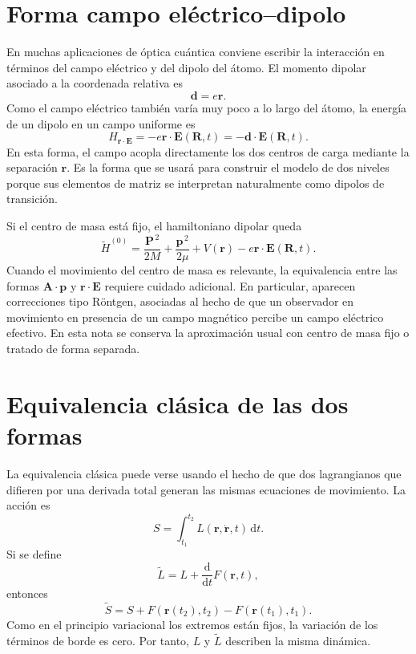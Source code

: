 \documentclass[11pt]{article}
\newcommand{\dd}{\mathrm{d}}
\newcommand{\vb}[1]{\mathbf{#1}}
\begin{document}
\section{Forma campo el\'ectrico--dipolo}

En muchas aplicaciones de \'optica cu\'antica conviene escribir la interacci\'on
en t\'erminos del campo el\'ectrico y del dipolo del \'atomo. El momento dipolar
asociado a la coordenada relativa es
\begin{equation}
  \vb d=e\vb r.
\end{equation}
Como el campo el\'ectrico tambi\'en var\'ia muy poco a lo largo del \'atomo,
la energ\'ia de un dipolo en un campo uniforme es
\begin{equation}
  \boxed{
  H_{\vb r\cdot\vb E}
  =
  -e\vb r\cdot\vb E(\vb R,t)
  =
  -\vb d\cdot\vb E(\vb R,t).
  }
\end{equation}
En esta forma, el campo acopla directamente los dos centros de carga mediante
la separaci\'on \(\vb r\). Es la forma que se usar\'a para construir el modelo
de dos niveles porque sus elementos de matriz se interpretan naturalmente como
dipolos de transici\'on.

Si el centro de masa est\'a fijo, el hamiltoniano dipolar queda
\begin{equation}
  \tilde H^{(0)}
  =
  \frac{\vb P^{\,2}}{2M}
  +
  \frac{\vb p^{\,2}}{2\mu}
  +
  V(\vb r)
  -
  e\vb r\cdot\vb E(\vb R,t).
\end{equation}
Cuando el movimiento del centro de masa es relevante, la equivalencia entre las
formas \(\vb A\cdot\vb p\) y \(\vb r\cdot\vb E\) requiere cuidado adicional.
En particular, aparecen correcciones tipo R\"ontgen, asociadas al hecho de que
un observador en movimiento en presencia de un campo magn\'etico percibe un
campo el\'ectrico efectivo. En esta nota se conserva la aproximaci\'on usual
con centro de masa fijo o tratado de forma separada.

\section{Equivalencia cl\'asica de las dos formas}

La equivalencia cl\'asica puede verse usando el hecho de que dos lagrangianos
que difieren por una derivada total generan las mismas ecuaciones de movimiento.
La acci\'on es
\begin{equation}
  S
  =
  \int_{t_1}^{t_2}
  L(\vb r,\dot{\vb r},t)\,\dd t.
\end{equation}
Si se define
\begin{equation}
  \tilde L
  =
  L+
  \frac{\dd}{\dd t}F(\vb r,t),
\end{equation}
entonces
\begin{equation}
  \tilde S
  =
  S+
  F(\vb r(t_2),t_2)
  -
  F(\vb r(t_1),t_1).
\end{equation}
Como en el principio variacional los extremos est\'an fijos, la variaci\'on de
los t\'erminos de borde es cero. Por tanto, \(L\) y \(\tilde L\) describen la
misma din\'amica.
\end{document}
